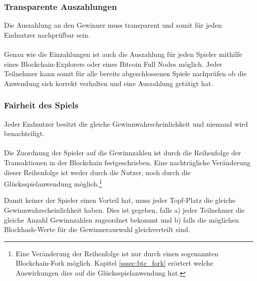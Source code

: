 \subsubsection{Transparente Auszahlungen}
Die Auszahlung an den Gewinner muss transparent und somit für jeden Endnutzer nachprüfbar sein.\\\\
Genau wie die Einzahlungen ist auch die Auszahlung für jeden Spieler mithilfe eines Blockchain-Explorers oder eines Bitcoin Full Nodes möglich. Jeder Teilnehmer kann somit für alle bereits abgeschlossenen Spiele nachprüfen ob die Anwendung sich korrekt verhalten und eine Auszahlung getätigt hat. 
\subsubsection{Fairheit des Spiels}
Jeder Endnutzer besitzt die gleiche Gewinnwahrscheinlichkeit und niemand wird benachteiligt.\\\\
Die Zuordnung der Spieler auf die Gewinnzahlen ist durch die Reihenfolge der Transaktionen in der Blockchain festgeschrieben. Eine nachträgliche Veränderung dieser Reihenfolge ist weder durch die Nutzer, noch durch die Glücksspielanwendung möglich.\footnote{Eine Veränderung der Reihenfolge ist nur durch einen sogenannten Blockchain-Fork möglich. Kapitel \ref{sssec:btc_fork} erörtert welche Auswirkungen dies auf die Glücksspielanwendung hat.}

Damit keiner der Spieler einen Vorteil hat, muss jeder Topf-Platz die gleiche Gewinnwahrscheinlichkeit haben.
Dies ist gegeben, falls a) jeder Teilnehmer die gleiche Anzahl Gewinnzahlen zugeordnet bekommt und b) falls die möglichen Blockhash-Werte für die Gewinnerauswahl gleichverteilt sind.\\

